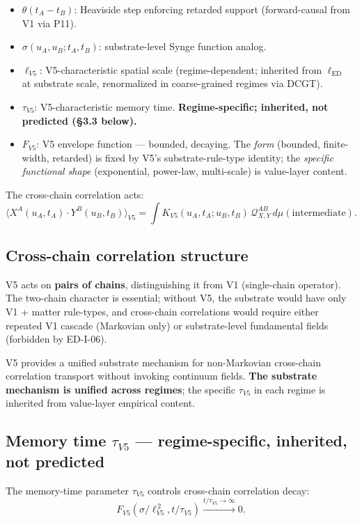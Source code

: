 \documentclass[11pt,a4paper]{article}
\begin{document}
\begin{itemize}[noitemsep]
\item $\theta(t_A - t_B)$: Heaviside step enforcing retarded support (forward-causal from V1 via P11).
\item $\sigma(u_A, u_B; t_A, t_B)$: substrate-level Synge function analog.
\item $\ell_{V5}$: V5-characteristic spatial scale (regime-dependent; inherited from $\ell_\mathrm{ED}$ at substrate scale, renormalized in coarse-grained regimes via DCGT).
\item $\tau_{V5}$: V5-characteristic memory time. \textbf{Regime-specific; inherited, not predicted (\S3.3 below).}
\item $F_{V5}$: V5 envelope function --- bounded, decaying. The \emph{form} (bounded, finite-width, retarded) is fixed by V5's substrate-rule-type identity; the \emph{specific functional shape} (exponential, power-law, multi-scale) is value-layer content.
\end{itemize}

The cross-chain correlation acts:
\[
\langle X^A(u_A, t_A) \cdot Y^B(u_B, t_B)\rangle_{V5} = \int K_{V5}(u_A, t_A; u_B, t_B)\,\mathcal{Q}_{X,Y}^{AB}\,d\mu(\mathrm{intermediate}).
\]

\subsection{Cross-chain correlation structure}

V5 acts on \textbf{pairs of chains}, distinguishing it from V1 (single-chain operator). The two-chain character is essential; without V5, the substrate would have only V1 + matter rule-types, and cross-chain correlations would require either repeated V1 cascade (Markovian only) or substrate-level fundamental fields (forbidden by ED-I-06).

V5 provides a unified substrate mechanism for non-Markovian cross-chain correlation transport without invoking continuum fields. \textbf{The substrate mechanism is unified across regimes}; the specific $\tau_{V5}$ in each regime is inherited from value-layer empirical content.

\subsection{Memory time $\tau_{V5}$ --- regime-specific, inherited, not predicted}

The memory-time parameter $\tau_{V5}$ controls cross-chain correlation decay:
\[
F_{V5}\!\left(\sigma/\ell_{V5}^{\,2}, t/\tau_{V5}\right) \xrightarrow{t/\tau_{V5} \to \infty} 0.
\]
\end{document}
